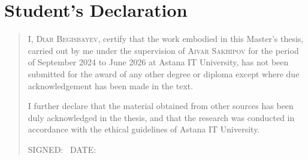 %
%
\chapter{Student's Declaration}
\begin{SingleSpace}
\begin{quote}
I, \textsc{Diar Begisbayev}, certify that the work embodied in this Master's thesis, carried out by me under the supervision of \textsc{Aivar Sakhipov} for the period of September 2024 to June 2026 at Astana IT University, has not been submitted for the award of any other degree or diploma except where due acknowledgement has been made in the text.

I further declare that the material obtained from other sources has been duly acknowledged in the thesis, and that the research was conducted in accordance with the ethical guidelines of Astana IT University.

\vspace{1.5cm}
\noindent
\hspace{-0.75cm}\textsc{SIGNED: \dotfill\ DATE: \dotfill}

\end{quote}
\end{SingleSpace}
\clearpage